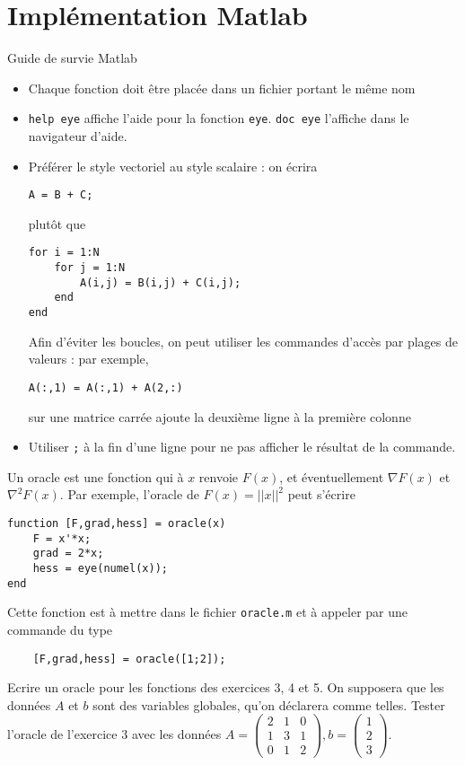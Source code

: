 \documentclass[12pt,a4paper,fleqn]{report}
\begin{document}
\section{Implémentation Matlab}
Guide de survie Matlab
\begin{itemize}
\item Chaque fonction doit être placée dans un fichier portant le même
  nom
\item \verb+help eye+ affiche l'aide pour la fonction
  \verb+eye+. \verb+doc eye+ l'affiche dans le navigateur d'aide.
\item Préférer le style vectoriel au style scalaire : on écrira
\begin{verbatim}
A = B + C;
\end{verbatim} plutôt que
\begin{verbatim}
for i = 1:N
    for j = 1:N
        A(i,j) = B(i,j) + C(i,j);
    end
end
\end{verbatim}

  Afin d'éviter les boucles, on peut utiliser les commandes d'accès
  par plages de valeurs : par exemple,
\begin{verbatim}
A(:,1) = A(:,1) + A(2,:)
\end{verbatim}
 sur une matrice carrée ajoute la deuxième ligne à la
  première colonne
\item Utiliser \verb+;+ à la fin d'une ligne pour ne pas afficher le
  résultat de la commande.
\end{itemize}

\begin{exercice}
  Un oracle est une fonction qui à $x$ renvoie $F(x)$, et
  éventuellement $\nabla F(x)$ et $\nabla^{2} F(x)$. Par exemple,
  l'oracle de $F(x) = ||x||^{2}$ peut s'écrire
\begin{verbatim}
function [F,grad,hess] = oracle(x)
    F = x'*x;
    grad = 2*x;
    hess = eye(numel(x));
end
\end{verbatim}

Cette fonction est à mettre dans le fichier \verb+oracle.m+ et à
appeler par une commande du type
\begin{verbatim}
    [F,grad,hess] = oracle([1;2]);
\end{verbatim}

Ecrire un oracle pour les fonctions des exercices 3, 4 et 5. On
supposera que les données $A$ et $b$ sont des variables globales,
qu'on déclarera comme telles. Tester l'oracle de l'exercice 3 avec les
données $A = \begin{pmatrix}2&1&0\\1&3&1\\0&1&2\end{pmatrix}, b
= \begin{pmatrix}1\\2\\3\end{pmatrix}$.
\end{exercice}
\end{document}
